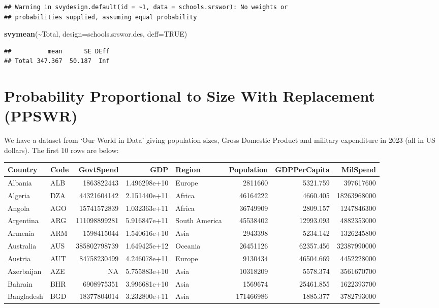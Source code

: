 \documentclass[
]{book}
\newenvironment{Shaded}{\begin{snugshade}}{\end{snugshade}}
\newcommand{\AttributeTok}[1]{\textcolor[rgb]{0.13,0.29,0.53}{#1}}
\newcommand{\ConstantTok}[1]{\textcolor[rgb]{0.56,0.35,0.01}{#1}}
\newcommand{\FunctionTok}[1]{\textcolor[rgb]{0.13,0.29,0.53}{\textbf{#1}}}
\newcommand{\NormalTok}[1]{#1}
\newcommand{\SpecialCharTok}[1]{\textcolor[rgb]{0.81,0.36,0.00}{\textbf{#1}}}
\begin{document}
\begin{verbatim}
## Warning in svydesign.default(id = ~1, data = schools.srswor): No weights or
## probabilities supplied, assuming equal probability
\end{verbatim}

\begin{Shaded}
\begin{Highlighting}[]
\FunctionTok{svymean}\NormalTok{(}\SpecialCharTok{\textasciitilde{}}\NormalTok{Total, }\AttributeTok{design=}\NormalTok{schools.srswor.des, }\AttributeTok{deff=}\ConstantTok{TRUE}\NormalTok{)}
\end{Highlighting}
\end{Shaded}

\begin{verbatim}
##          mean      SE DEff
## Total 347.367  50.187  Inf
\end{verbatim}

\section{Probability Proportional to Size With Replacement (PPSWR)}\label{probability-proportional-to-size-with-replacement-ppswr}

We have a dataset from `Our World in Data' giving population sizes,
Gross Domestic Product and military expenditure in 2023 (all in US dollars).
The first 10 rows are below:

\begin{table}
\centering
\begin{tabular}[t]{l|l|r|r|l|r|r|r}
\hline
Country & Code & GovtSpend & GDP & Region & Population & GDPPerCapita & MilSpend\\
\hline
Albania & ALB & 1863822443 & 1.496298e+10 & Europe & 2811660 & 5321.759 & 397617600\\
\hline
Algeria & DZA & 44321604142 & 2.151440e+11 & Africa & 46164222 & 4660.405 & 18263968000\\
\hline
Angola & AGO & 15741572839 & 1.032363e+11 & Africa & 36749909 & 2809.157 & 1247846300\\
\hline
Argentina & ARG & 111098899281 & 5.916847e+11 & South America & 45538402 & 12993.093 & 4882353000\\
\hline
Armenia & ARM & 1598415044 & 1.540616e+10 & Asia & 2943398 & 5234.142 & 1326245800\\
\hline
Australia & AUS & 385802798739 & 1.649425e+12 & Oceania & 26451126 & 62357.456 & 32387990000\\
\hline
Austria & AUT & 84758230499 & 4.246078e+11 & Europe & 9130434 & 46504.669 & 4452228000\\
\hline
Azerbaijan & AZE & NA & 5.755883e+10 & Asia & 10318209 & 5578.374 & 3561670700\\
\hline
Bahrain & BHR & 6908975351 & 3.996681e+10 & Asia & 1569674 & 25461.855 & 1622393700\\
\hline
Bangladesh & BGD & 18377804014 & 3.232800e+11 & Asia & 171466986 & 1885.377 & 3782793000\\
\hline
\end{tabular}
\end{table}
\end{document}
